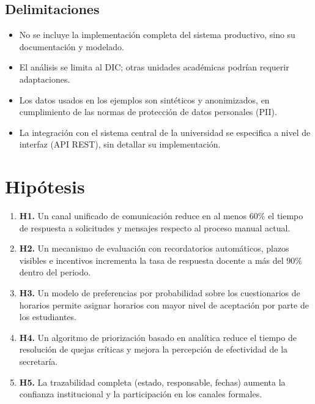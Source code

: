 \subsection{Delimitaciones}
\begin{itemize}[leftmargin=1.4cm, itemsep=3pt]
  \item No se incluye la implementación completa del sistema productivo, sino su
        documentación y modelado.
  \item El análisis se limita al \ac{DIC}; otras unidades académicas podrían
        requerir adaptaciones.
  \item Los datos usados en los ejemplos son sintéticos y anonimizados, en
        cumplimiento de las normas de protección de datos personales (\ac{PII}).
  \item La integración con el sistema central de la universidad se especifica a
        nivel de interfaz (\ac{API} \ac{REST}), sin detallar su implementación.
\end{itemize}

\section{Hipótesis}

\begin{enumerate}[leftmargin=1.4cm, itemsep=4pt]
  \item \textbf{H1.} Un canal unificado de comunicación reduce en al menos
        $60\%$ el tiempo de respuesta a solicitudes y mensajes respecto al
        proceso manual actual.
  \item \textbf{H2.} Un mecanismo de evaluación con recordatorios automáticos,
        plazos visibles e incentivos incrementa la tasa de respuesta docente
        a más del $90\%$ dentro del periodo.
  \item \textbf{H3.} Un modelo de preferencias por probabilidad sobre los
        cuestionarios de horarios permite asignar horarios con mayor nivel de
        aceptación por parte de los estudiantes.
  \item \textbf{H4.} Un algoritmo de priorización basado en analítica reduce el
        tiempo de resolución de quejas críticas y mejora la percepción de
        efectividad de la secretaría.
  \item \textbf{H5.} La trazabilidad completa (estado, responsable, fechas)
        aumenta la confianza institucional y la participación en los canales
        formales.
\end{enumerate}

